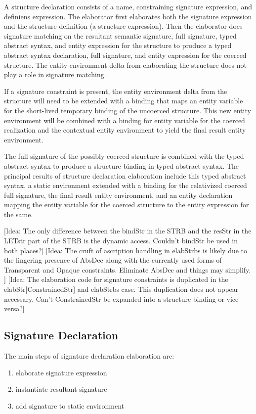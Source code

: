 A structure declaration consists of a name, constraining signature expression, and definiens expression. The elaborator first elaborates both the signature expression and the structure definition (a structure expression). Then the elaborator does signature matching on the resultant semantic signature, full signature, typed abstract syntax, and entity expression for the structure to produce a typed abstract syntax declaration, full signature, and entity expression for the coerced structure. The entity environment delta from elaborating the structure does not play a role in signature matching. 

If a signature constraint is present, the entity environment delta from the structure will need to be extended with a binding that maps an entity variable for the short-lived temporary binding of the uncoerced structure. This new entity environment will be combined with a binding for entity variable for the coerced realization and the contextual entity environment to yield the final result entity environment. 

The full signature of the possibly coerced structure is combined with the typed abstract syntax to produce a structure binding in typed abstract syntax. The principal results of structure declaration elaboration include this typed abstract syntax, a static environment extended with a binding for the relativized coerced full signature, the final result entity environment, and an entity declaration mapping the entity variable for the coerced structure to the entity expression for the same.

[Idea: The only difference between the bindStr in the STRB and the resStr in the LETstr part of the STRB is the dynamic access. Couldn't bindStr be used in both places?]
[Idea: The cruft of ascription handling in elabStrbs is likely due to the lingering presence of AbsDec along with the currently used forms of Transparent and Opaque constraints. Eliminate AbsDec and things may simplify. ]
[Idea: The elaboration code for signature constraints is duplicated in the elabStr[ConstrainedStr] and elabStrbs case. This duplication does not appear necessary. Can't ConstrainedStr be expanded into a structure binding or vice versa?]

\subsection{Signature Declaration}
The main steps of signature declaration elaboration are:
\begin{enumerate}
\item elaborate signature expression
\item instantiate resultant signature
\item add signature to static environment
\end{enumerate}

